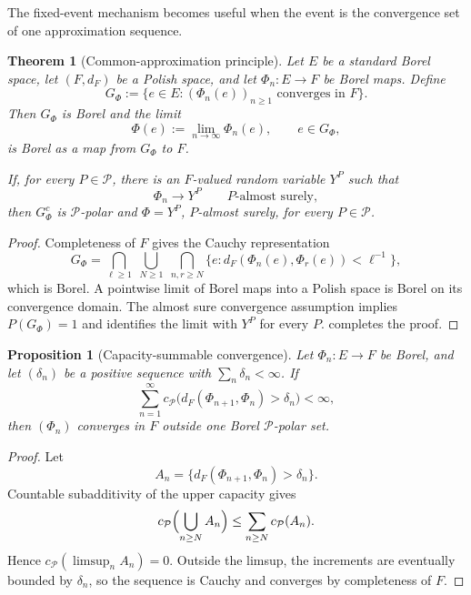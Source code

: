 \documentclass[11pt,reqno]{amsart}
\theoremstyle{plain}
\newtheorem{theorem}{Theorem}[section]
\newtheorem{proposition}[proposition]{Proposition}
\theoremstyle{definition}
\newcommand{\cP}{\mathcal P}
\begin{document}
The fixed-event mechanism becomes useful when the event is the convergence
set of one approximation sequence.

\begin{theorem}[Common-approximation principle]\label{thm:common-approx}
Let \(E\) be a standard Borel space, let \((F,d_F)\) be a Polish space, and let
\(\Phi_n:E\to F\) be Borel maps.  Define
\begin{equation}\label{eq:common-convergence-set}
  G_\Phi
  :=
  \{e\in E:(\Phi_n(e))_{n\ge1}\text{ converges in }F\}.
\end{equation}
Then \(G_\Phi\) is Borel and the limit
\[
  \Phi(e):=\lim_{n\to\infty}\Phi_n(e),\qquad e\in G_\Phi,
\]
is Borel as a map from \(G_\Phi\) to \(F\).

If, for every \(P\in\cP\), there is an \(F\)-valued random variable
\(Y^P\) such that
\[
  \Phi_n\longrightarrow Y^P
  \qquad P\text{-almost surely},
\]
then \(G_\Phi^c\) is \(\cP\)-polar and \(\Phi=Y^P\),
\(P\)-almost surely, for every \(P\in\cP\).
\end{theorem}

\begin{proof}
Completeness of \(F\) gives the Cauchy representation
\[
  G_\Phi
  =
  \bigcap_{\ell\ge1}\;
  \bigcup_{N\ge1}\;
  \bigcap_{n,r\ge N}
  \bigl\{e:d_F(\Phi_n(e),\Phi_r(e))<\ell^{-1}\bigr\},
\]
which is Borel.  A pointwise limit of Borel maps into a Polish space is Borel
on its convergence domain.  The almost sure convergence assumption implies
\(P(G_\Phi)=1\) and identifies the limit with \(Y^P\) for every
\(P\).   completes the proof.
\end{proof}

\begin{proposition}[Capacity-summable convergence]\label{prop:capacity-bc}
Let \(\Phi_n:E\to F\) be Borel, and let \((\delta_n)\) be a positive sequence
with \(\sum_n\delta_n<\infty\).  If
\begin{equation}\label{eq:capacity-summable}
  \sum_{n=1}^{\infty}
  c_{\cP}\bigl(
    d_F(\Phi_{n+1},\Phi_n)>\delta_n
  \bigr)<\infty,
\end{equation}
then \((\Phi_n)\) converges in \(F\) outside one Borel
\(\cP\)-polar set.
\end{proposition}

\begin{proof}
Let
\[
  A_n=\{d_F(\Phi_{n+1},\Phi_n)>\delta_n\}.
\]
Countable subadditivity of the upper capacity gives
\[
  c_{\cP}\Bigl(\bigcup_{n\ge N}A_n\Bigr)
  \le\sum_{n\ge N}c_{\cP}(A_n).
\]
Hence \(c_{\cP}(\limsup_nA_n)=0\).  Outside the limsup, the increments are
eventually bounded by \(\delta_n\), so the sequence is Cauchy and converges by
completeness of \(F\).
\end{proof}
\end{document}
